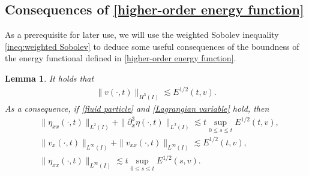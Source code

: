 \documentclass[11pt, reqno]{amsart}
\newtheorem{lemma}{Lemma}
\numberwithin{equation}{section}
\begin{document}
\subsection{Consequences of \eqref{higher-order energy function}}\label{consequency of higher-order energy function}


As a prerequisite for later use, we will use the weighted Sobolev inequality \eqref{ineq:weighted Sobolev} to deduce some useful consequences of the boundness of the energy functional defined in  \eqref{higher-order energy function}. 
\begin{lemma}\label{le:Preliminary-1} It holds that
	\begin{align}\label{Preliminary-1}
		\|v(\cdot,t)\|_{H^3(I)}\lesssim E^{1/2}(t,v).
	\end{align}
	As a consequence, if \eqref{fluid particle} and \eqref{Lagrangian variable} hold, then 
	\begin{align}
		&\|\eta_{xx}(\cdot,t)\|_{L^2(I)}+\|\partial_x^3\eta(\cdot,t)\|
		_{L^2(I)}\lesssim t\sup_{0\leq s\leq t}E^{1/2}(t,v),\label{Preliminary-2}\\
		&\|v_x(\cdot,t)\|_{L^\infty(I)}
		+\|v_{xx}(\cdot,t)\|_{L^\infty(I)}\lesssim E^{1/2}(t,v),\label{Preliminary-3}\\
		&\|\eta_{xx}(\cdot,t)\|_{L^\infty(I)}\lesssim t\sup_{0\leq s\leq t}E^{1/2}(s,v)\label{Preliminary-5}.
	\end{align}
\end{lemma}
\end{document}
